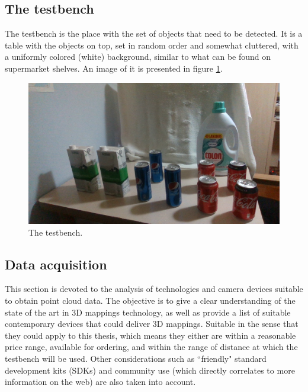 \documentclass[../main.tex]{subfiles}
\begin{document}
\subsection{The testbench} \label{sec:the_testbench}
The testbench is the place with the set of objects that need to be detected. It is a table with the objects on top, set in random order and somewhat cluttered, with a uniformly colored (white) background, similar to what can be found on supermarket shelves. An image of it is presented in figure \ref{fig:testbench_presentation}.

\begin{figure}[H]
    \centering
    \includegraphics[width=1\textwidth]{images/testbench_presentation.png}
    \caption{The testbench.}
    \label{fig:testbench_presentation}
\end{figure}

\subsection{Data acquisition} \label{sec:data_acquisition}
This section is devoted to the analysis of technologies and camera devices suitable to obtain point cloud data. The objective is to give a clear understanding of the state of the art in 3D mappings technology, as well as provide a list of suitable contemporary devices that could deliver 3D mappings. Suitable in the sense that they could apply to this thesis, which means they either are within a reasonable price range, available for ordering, and within the range of distance at which the testbench will be used. Other considerations such as ``friendly" standard development kits (SDKs) and community use (which directly correlates to more information on the web) are also taken into account.
\end{document}
